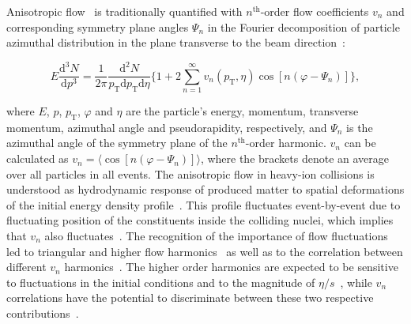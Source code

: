 Anisotropic flow~\cite{Ollitrault:1992bk} is traditionally quantified with $n^{\mathrm{th}}$-order flow coefficients $v_n$ and corresponding symmetry plane angles $\Psi_n$ in the Fourier decomposition of particle azimuthal distribution in the plane transverse to the beam direction~\cite{Voloshin:1994mz}:

\begin{equation}
E\frac{\mathrm{d}^3N}{\mathrm{d}p^3} = \frac{1}{2\pi}\frac{\mathrm{d}^2N}{p_{\mathrm{T}}\mathrm{d}p_{\mathrm{T}}\mathrm{d}\eta} \Big\{1 + 2\sum_{n=1}^{\infty} v_n(p_{\mathrm{T}},\eta) \cos[n(\varphi - \Psi_n)]\Big\},
\label{Eq:Fourier}
\end{equation}

\noindent where $E$, $p$, $p_{\mathrm{T}}$, $\varphi$ and $\eta$ are the particle's energy, momentum, transverse momentum, azimuthal angle and pseudorapidity, respectively, and $\Psi_n$ is the azimuthal angle of the symmetry plane of the $n^{\mathrm{th}}$-order harmonic. $v_n$ can be calculated as $v_{n} = \langle{\cos[n(\varphi - \Psi_n)]}\rangle$, where the brackets denote an average over all particles in all events.
The anisotropic flow in heavy-ion collisions is understood as hydrodynamic response of produced matter to spatial deformations of the initial energy density profile~\cite{Floerchinger:2013tya}.
This profile fluctuates event-by-event due to fluctuating position of the constituents inside the colliding nuclei, which implies that $v_n$ also fluctuates~\cite{Miller:2003kd,Alver:2006wh}.
The recognition of the importance of flow fluctuations led to triangular and higher flow harmonics~\cite{Alver:2010gr,ALICE:2011ab} as well as to the correlation between different $v_{n}$ harmonics~\cite{Niemi:2012aj,Aad:2014fla}.
The higher order harmonics are expected to be sensitive to fluctuations in the initial conditions and to the magnitude of $\eta/s$~\cite{Alver:2010dn,Luzum:2012wu}, while $v_{n}$ correlations have the potential to discriminate between these two respective contributions~\cite{Niemi:2012aj}.

